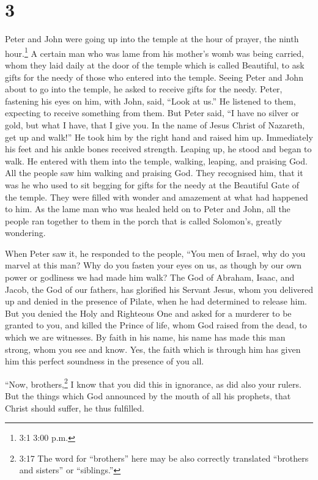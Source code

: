 \hypertarget{section-2}{%
\section{3}\label{section-2}}

 Peter and John were going up into the temple at the hour of
prayer, the ninth hour.\footnote{3:1 3:00 p.m.}  A certain
man who was lame from his mother's womb was being carried, whom they
laid daily at the door of the temple which is called Beautiful, to ask
gifts for the needy of those who entered into the temple. 
Seeing Peter and John about to go into the temple, he asked to receive
gifts for the needy.  Peter, fastening his eyes on him, with
John, said, ``Look at us.''  He listened to them, expecting
to receive something from them.  But Peter said, ``I have no
silver or gold, but what I have, that I give you. In the name of Jesus
Christ of Nazareth, get up and walk!''  He took him by the
right hand and raised him up. Immediately his feet and his ankle bones
received strength.  Leaping up, he stood and began to walk.
He entered with them into the temple, walking, leaping, and praising
God.  All the people saw him walking and praising God.
 They recognised him, that it was he who used to sit
begging for gifts for the needy at the Beautiful Gate of the temple.
They were filled with wonder and amazement at what had happened to him.
 As the lame man who was healed held on to Peter and John,
all the people ran together to them in the porch that is called
Solomon's, greatly wondering.

 When Peter saw it, he responded to the people, ``You men
of Israel, why do you marvel at this man? Why do you fasten your eyes on
us, as though by our own power or godliness we had made him walk?
 The God of Abraham, Isaac, and Jacob, the God of our
fathers, has glorified his Servant Jesus, whom you delivered up and
denied in the presence of Pilate, when he had determined to release him.
 But you denied the Holy and Righteous One and asked for a
murderer to be granted to you,  and killed the Prince of
life, whom God raised from the dead, to which we are witnesses.
 By faith in his name, his name has made this man strong,
whom you see and know. Yes, the faith which is through him has given him
this perfect soundness in the presence of you all.

 ``Now, brothers,\footnote{3:17 The word for ``brothers''
  here may be also correctly translated ``brothers and sisters'' or
  ``siblings.''} I know that you did this in ignorance, as did also your
rulers.  But the things which God announced by the mouth of
all his prophets, that Christ should suffer, he thus fulfilled.


